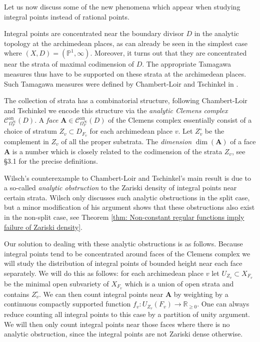 \documentclass[a4paper,11pt,reqno]{amsart}
\newcommand{\R}{\mathbb{R}}
\newcommand{\Proj}{\mathbb{P}}
\DeclareMathOperator{\an}{an}
\theoremstyle{definition}
\begin{document}
Let us now discuss some of the new phenomena which appear when studying integral points instead of rational points.

Integral points are concentrated near the boundary divisor $D$ in the analytic topology at the archimedean places, as can already be seen in the simplest case where $(X,D) = (\Proj^1, \infty)$. Moreover, it turns out that they are concentrated near the strata of maximal codimension of $D$. The appropriate Tamagawa measures thus have to be supported on these strata at the archimedean places. Such Tamagawa measures were defined by Chambert-Loir and Tschinkel in \cite[\S2.1.12]{Chambert-Loir2010Igusa}. 

The collection of strata has a combinatorial structure, following Chambert-Loir and Tschinkel \cite[\S3.1]{Chambert-Loir2010Igusa} we encode this structure via the \emph{analytic Clemens complex} $\mathcal{C}^{\an}_{\Omega_{F}^{\infty}}(D)$. A \emph{face} $\mathbf{A} \in \mathcal{C}^{\an}_{\Omega_{F}^{\infty}}(D)$ of the Clemens complex essentially consist of a choice of stratum $Z_v \subset D_{F_v}$ for each archimedean place $v$. Let $Z_v^{\circ}$ be the complement in $Z_v$ of all the proper substrata. The \emph{dimension} $\dim(\mathbf{A})$ of a face $\mathbf{A}$ is a number which is closely related to the codimension of the strata $Z_v$, see \S3.1 for the precise definitions.

Wilsch's counterexample \cite{Wilsch2022Integral} to Chambert-Loir and Tschinkel's main result \cite{Chambert-Loir2010Integral} is due to a so-called \emph{analytic obstruction} to the Zariski density of integral points near certain strata. Wilsch only discusses such analytic obstructions in the split case, but a minor modification of his argument shows that these obstructions also exist in the non-split case, see Theorem \ref{thm: Non-constant regular functions imply failure of Zariski density}.

Our solution to dealing with these analytic obstructions is as follows. Because integral points tend to be concentrated around faces of the Clemens complex we will study the distribution of integral points of bounded height near each face separately. We will do this as follows: for each archimedean place $v$ let $U_{Z_v} \subset X_{F_v}$ be the minimal open subvariety of $X_{F_v}$ which is a union of open strata and contains $Z_v^{\circ}$. We can then count integral points near $\mathbf{A}$ by weighting by a continuous compactly supported function $f_v: U_{Z_v}(F_v) \to \R_{\geq 0}$. One can always reduce counting all integral points to this case by a partition of unity argument. We will then only count integral points near those faces where there is no analytic obstruction, since the integral points are not Zariski dense otherwise.
\end{document}
